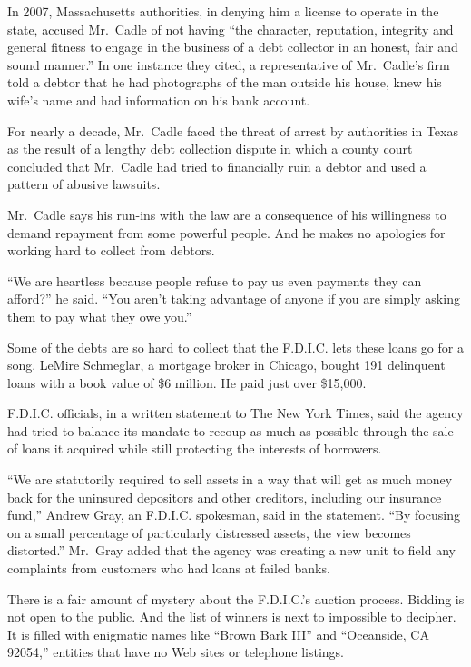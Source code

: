 \documentclass[12pt,a4paper,onecolumn]{article}
\begin{document}
In 2007, Massachusetts authorities, in denying him a license to operate in the state, accused
Mr.~Cadle of not having ``the character, reputation, integrity and general fitness to engage in the
business of a debt collector in an honest, fair and sound manner.'' In one instance they cited, a
representative of Mr.~Cadle's firm told a debtor that he had photographs of the man outside his
house, knew his wife's name and had information on his bank account.

For nearly a decade, Mr.~Cadle faced the threat of arrest by authorities in Texas as the result of a
lengthy debt collection dispute in which a county court concluded that Mr.~Cadle had tried to
financially ruin a debtor and used a pattern of abusive lawsuits.

Mr.~Cadle says his run-ins with the law are a consequence of his willingness to demand repayment
from some powerful people. And he makes no apologies for working hard to collect from debtors.

``We are heartless because people refuse to pay us even payments they can afford?'' he said. ``You
aren't taking advantage of anyone if you are simply asking them to pay what they owe you.''

Some of the debts are so hard to collect that the F.D.I.C. lets these loans go for a song. LeMire
Schmeglar, a mortgage broker in Chicago, bought 191 delinquent loans with a book value of \$6
million. He paid just over \$15,000.

F.D.I.C. officials, in a written statement to The New York Times, said the agency had tried to
balance its mandate to recoup as much as possible through the sale of loans it acquired while still
protecting the interests of borrowers.

``We are statutorily required to sell assets in a way that will get as much money back for the
uninsured depositors and other creditors, including our insurance fund,'' Andrew Gray, an F.D.I.C.
spokesman, said in the statement. ``By focusing on a small percentage of particularly distressed
assets, the view becomes distorted.'' Mr.~Gray added that the agency was creating a new unit to
field any complaints from customers who had loans at failed banks.

There is a fair amount of mystery about the F.D.I.C.'s auction process. Bidding is not open to the
public. And the list of winners is next to impossible to decipher. It is filled with enigmatic names
like ``Brown Bark III'' and ``Oceanside, CA 92054,'' entities that have no Web sites or telephone
listings.
\end{document}
